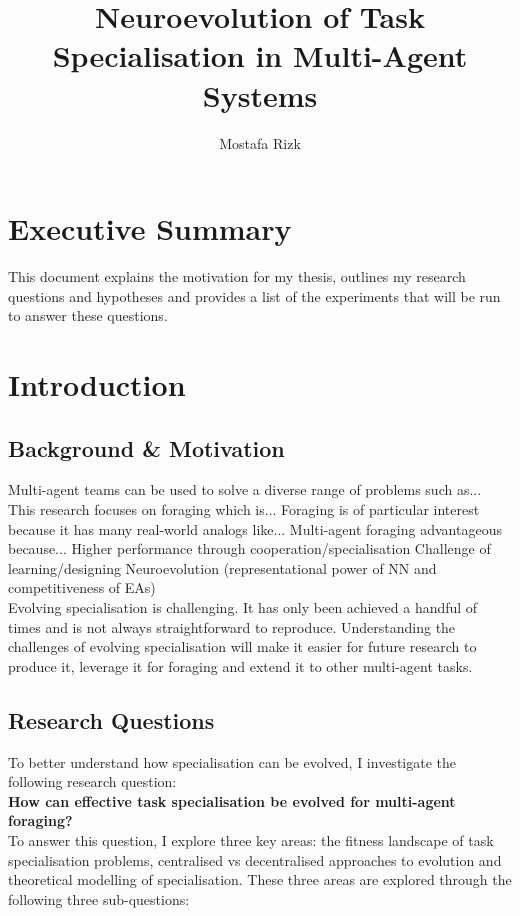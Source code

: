 \documentclass[12pt]{article}
\title{Neuroevolution of Task Specialisation in Multi-Agent Systems}
\author{Mostafa Rizk}
\begin{document}
\maketitle

\section{Executive Summary}

This document explains the motivation for my thesis, outlines my research questions and hypotheses and provides a list of the experiments that will be run to answer these questions.

\section{Introduction}

\subsection{Background \& Motivation}

Multi-agent teams can be used to solve a diverse range of problems such as...
This research focuses on foraging which is...
Foraging is of particular interest because it has many real-world analogs like...
Multi-agent foraging advantageous because...
Higher performance through cooperation/specialisation
Challenge of learning/designing
Neuroevolution (representational power of NN and competitiveness of EAs)
\\

Evolving specialisation is challenging.
It has only been achieved a handful of times and is not always straightforward to reproduce.
Understanding the challenges of evolving specialisation will make it easier for future research to produce it, leverage it for foraging and extend it to other multi-agent tasks.

\subsection{Research Questions}

To better understand how specialisation can be evolved, I investigate the following research question:\\

\textbf{How can effective task specialisation be evolved for multi-agent foraging?}\\

To answer this question, I explore three key areas:  the fitness landscape of task specialisation problems, centralised vs decentralised approaches to evolution and theoretical modelling of specialisation.
These three areas are explored through the following three sub-questions:\\
\end{document}
